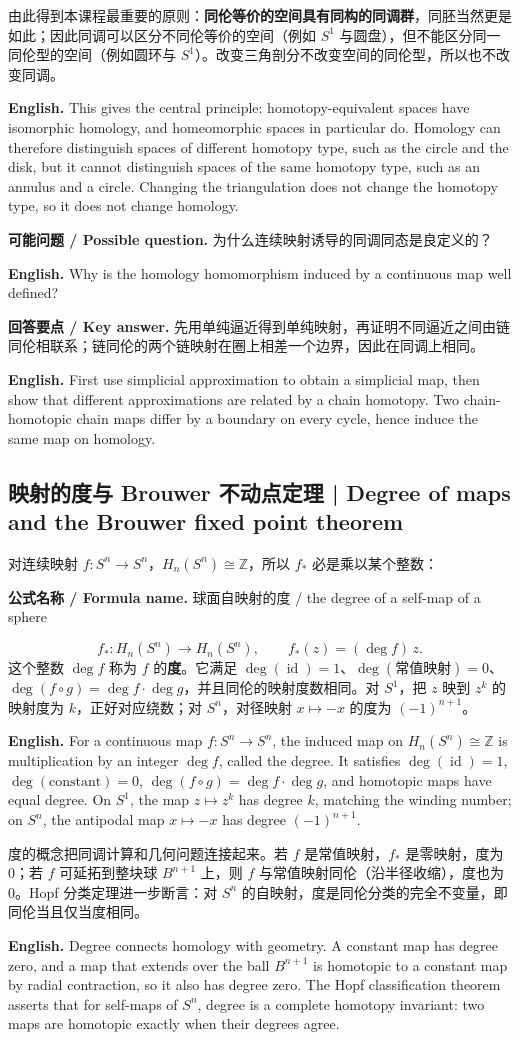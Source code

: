 \documentclass[UTF8,11pt,a4paper]{ctexart}
\newcommand{\EN}[1]{\par\noindent\textbf{English.} #1\par}
\newcommand{\FORMULA}[2]{\par\noindent\textbf{公式名称 / Formula name.} #1 / #2\par}
\newcommand{\ASK}[4]{\par\noindent\textbf{可能问题 / Possible question.} #1\par\EN{#2}\noindent\textbf{回答要点 / Key answer.} #3\par\EN{#4}\medskip}
\begin{document}
\noindent 由此得到本课程最重要的原则：\textbf{同伦等价的空间具有同构的同调群}，同胚当然更是如此；因此同调可以区分不同伦等价的空间（例如 $S^1$ 与圆盘），但不能区分同一同伦型的空间（例如圆环与 $S^1$）。改变三角剖分不改变空间的同伦型，所以也不改变同调。
\EN{This gives the central principle: homotopy-equivalent spaces have isomorphic homology, and homeomorphic spaces in particular do. Homology can therefore distinguish spaces of different homotopy type, such as the circle and the disk, but it cannot distinguish spaces of the same homotopy type, such as an annulus and a circle. Changing the triangulation does not change the homotopy type, so it does not change homology.}

\ASK{为什么连续映射诱导的同调同态是良定义的？}{Why is the homology homomorphism induced by a continuous map well defined?}{先用单纯逼近得到单纯映射，再证明不同逼近之间由链同伦相联系；链同伦的两个链映射在圈上相差一个边界，因此在同调上相同。}{First use simplicial approximation to obtain a simplicial map, then show that different approximations are related by a chain homotopy. Two chain-homotopic chain maps differ by a boundary on every cycle, hence induce the same map on homology.}

\subsection{映射的度与 Brouwer 不动点定理 | Degree of maps and the Brouwer fixed point theorem}
\noindent 对连续映射 $f:S^n\to S^n$，$H_n(S^n)\cong\mathbb Z$，所以 $f_*$ 必是乘以某个整数：
\FORMULA{球面自映射的度}{the degree of a self-map of a sphere}
\[
f_*:H_n(S^n)\to H_n(S^n),\qquad f_*(z)=(\deg f)\,z.
\]
这个整数 $\deg f$ 称为 $f$ 的\textbf{度}。它满足 $\deg(\operatorname{id})=1$、$\deg(\text{常值映射})=0$、$\deg(f\circ g)=\deg f\cdot\deg g$，并且同伦的映射度数相同。对 $S^1$，把 $z$ 映到 $z^k$ 的映射度为 $k$，正好对应绕数；对 $S^n$，对径映射 $x\mapsto -x$ 的度为 $(-1)^{n+1}$。
\EN{For a continuous map $f:S^n\to S^n$, the induced map on $H_n(S^n)\cong\mathbb Z$ is multiplication by an integer $\deg f$, called the degree. It satisfies $\deg(\operatorname{id})=1$, $\deg(\text{constant})=0$, $\deg(f\circ g)=\deg f\cdot\deg g$, and homotopic maps have equal degree. On $S^1$, the map $z\mapsto z^k$ has degree $k$, matching the winding number; on $S^n$, the antipodal map $x\mapsto -x$ has degree $(-1)^{n+1}$.}

\noindent 度的概念把同调计算和几何问题连接起来。若 $f$ 是常值映射，$f_*$ 是零映射，度为 $0$；若 $f$ 可延拓到整块球 $B^{n+1}$ 上，则 $f$ 与常值映射同伦（沿半径收缩），度也为 $0$。Hopf 分类定理进一步断言：对 $S^n$ 的自映射，度是同伦分类的完全不变量，即同伦当且仅当度相同。
\EN{Degree connects homology with geometry. A constant map has degree zero, and a map that extends over the ball $B^{n+1}$ is homotopic to a constant map by radial contraction, so it also has degree zero. The Hopf classification theorem asserts that for self-maps of $S^n$, degree is a complete homotopy invariant: two maps are homotopic exactly when their degrees agree.}
\end{document}
